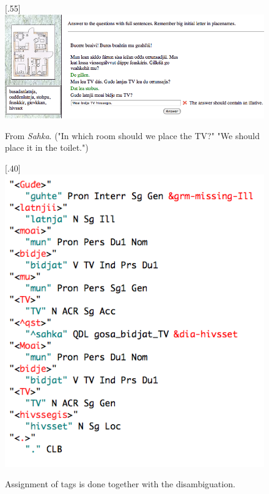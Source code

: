 \documentclass[11pt]{article}
\begin{document}
\begin{figure}[htbp]
\begin{center}
\scalebox{.55}[.55]{\includegraphics{presentation/img/TVhivssegis.png}}\\
\caption{From \textit{Sahka}. ("In which room should we place the TV?" "We should place it in the toilet.")
}
\label{sahka}
\end{center}
\end{figure}


\begin{figure}[htbp]
\begin{center}
\scalebox{.40}[.40]{\includegraphics{presentation/img/hivssegisCGanal.png}}\\
\caption{Assignment of tags is done together with the disambiguation.}
\label{hivssetanalysis}
\end{center}
\end{figure}
\end{document}
